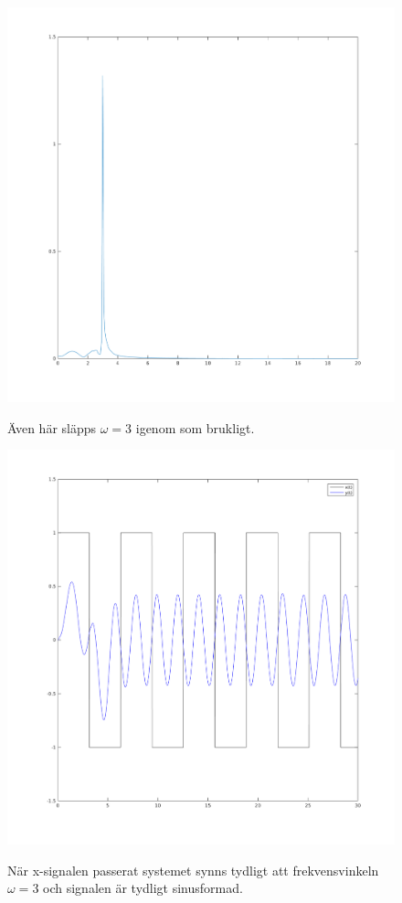 \begin{figure}
    \caption{Även här släpps $\omega = 3$ igenom som brukligt.}
    \centering
    \includegraphics[scale=0.25]{figures/task4e-fk-y-sys2.png}
    \label{fig:task4e-fk-y-sys2}
\end{figure}

\clearpage

\begin{figure}
    \caption{När x-signalen passerat systemet synns tydligt att frekvensvinkeln
    $\omega = 3$ och signalen är tydligt sinusformad.}
    \centering
    \includegraphics[scale=0.55]{figures/task4e-xsignal-sys2.png}
    \label{fig:task4e-xsignal-sys2}
\end{figure}

